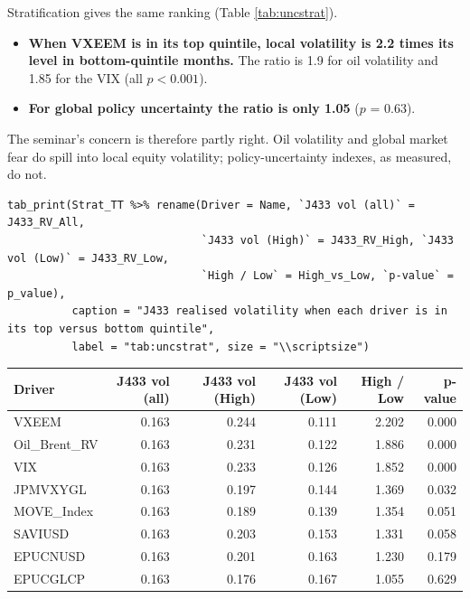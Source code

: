 \documentclass[11pt,preprint]{elsarticle}
\let\origtable\table
\let\endorigtable\endtable
\renewenvironment{table}[1][2] {
    \expandafter\origtable\expandafter[H]
} {
    \endorigtable
}
\numberwithin{equation}{section}
\numberwithin{figure}{section}
\numberwithin{table}{section}
\def\tightlist{} %
\begin{document}
Stratification gives the same ranking (Table \ref{tab:uncstrat}).

\begin{itemize}
\tightlist
\item
  \textbf{When VXEEM is in its top quintile, local volatility is 2.2
  times its level in bottom-quintile months.} The ratio is 1.9 for oil
  volatility and 1.85 for the VIX (all \(p < 0.001\)).
\item
  \textbf{For global policy uncertainty the ratio is only 1.05} (\(p\) =
  0.63).
\end{itemize}

The seminar's concern is therefore partly right. Oil volatility and
global market fear do spill into local equity volatility;
policy-uncertainty indexes, as measured, do not.

\begin{verbatim}
tab_print(Strat_TT %>% rename(Driver = Name, `J433 vol (all)` = J433_RV_All,
                              `J433 vol (High)` = J433_RV_High, `J433 vol (Low)` = J433_RV_Low,
                              `High / Low` = High_vs_Low, `p-value` = p_value),
          caption = "J433 realised volatility when each driver is in its top versus bottom quintile",
          label = "tab:uncstrat", size = "\\scriptsize")
\end{verbatim}

\begin{table}[!htbp]
\centering
\caption{J433 realised volatility when each driver is in its top versus bottom quintile} 
\label{tab:uncstrat}
\begingroup\scriptsize
\begin{tabular}{lrrrrr}
  \hline
Driver & J433 vol (all) & J433 vol (High) & J433 vol (Low) & High / Low & p-value \\ 
  \hline
VXEEM & 0.163 & 0.244 & 0.111 & 2.202 & 0.000 \\ 
  Oil\_Brent\_RV & 0.163 & 0.231 & 0.122 & 1.886 & 0.000 \\ 
  VIX & 0.163 & 0.233 & 0.126 & 1.852 & 0.000 \\ 
  JPMVXYGL & 0.163 & 0.197 & 0.144 & 1.369 & 0.032 \\ 
  MOVE\_Index & 0.163 & 0.189 & 0.139 & 1.354 & 0.051 \\ 
  SAVIUSD & 0.163 & 0.203 & 0.153 & 1.331 & 0.058 \\ 
  EPUCNUSD & 0.163 & 0.201 & 0.163 & 1.230 & 0.179 \\ 
  EPUCGLCP & 0.163 & 0.176 & 0.167 & 1.055 & 0.629 \\ 
   \hline
\end{tabular}
\endgroup
\end{table}
\end{document}
